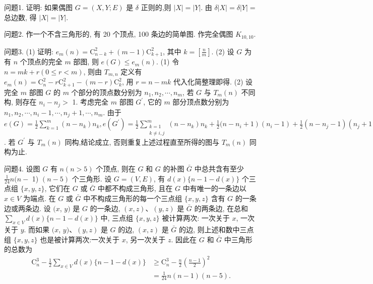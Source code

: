 
问题1. 证明: 如果偶图 $G=(X, Y ; E)$ 是 $\delta$ 正则的,则 $|X|=|Y|$.
由 $\delta|X|=\delta|Y|=$ 总边数, 得 $|X|=|Y|$.



问题2. 作一个不含三角形的, 有 20 个顶点, 100 条边的简单图.
作完全偶图 $K_{10,10}$.



问题3. (1) 证明: $e_m(n)=\mathrm{C}_{n-k}^2+(m-1) \mathrm{C}_{k+1}^2$, 其中 $k=\left[\frac{n}{m}\right]$.
(2) 设 $G$ 为有 $n$ 个顶点的完全 $m$ 部图, 则 $e(G) \leqslant e_m(n)$.
(1) 令 $n=m k+r(0 \leqslant r<m)$, 则由 $T_{m, n}$ 定义有 $e_m(n)=\mathrm{C}_n^2-r \mathrm{C}_{k+1}^2- (m-r) \mathrm{C}_k^2$, 用 $r=n-m k$ 代入化简整理即得.
(2) 设完全 $m$ 部图 $G$ 的 $m$ 个部分的顶点数分别为 $n_1, n_2, \cdots, n_m$, 若 $G$ 与 $T_m(n)$ 不同构, 则存在 $n_i-n_j>$ 1. 考虑完全 $m$ 部图 $G^{\prime}$, 它的 $m$ 部分顶点数分别为 $n_1, n_2, \cdots, n_i-1, \cdots, n_j+ 1, \cdots, n_m$. 由于 $e(G)=\frac{1}{2} \sum_{k=1}^m\left(n-n_k\right) n_k, e\left(G^{\prime}\right)=\frac{1}{2} \sum_{\substack{k=1 \\ k \neq i, j}}^m\left(n-n_k\right) n_k+\frac{1}{2}(n- \left.n_i+1\right)\left(n_i-1\right)+\frac{1}{2}\left(n-n_j-1\right)\left(n_j+1\right)=e(G)+\left(n_i-n_j\right)-1>e(G)$. 若 $G^{\prime}$ 与 $T_m(n)$ 同构,结论成立, 否则重复上述过程直至所得的图与 $T_m(n)$ 同构为止.



问题4. 设图 $G$ 有 $n(n>5)$ 个顶点, 则在 $G$ 和 $G$ 的补图 $\bar{G}$ 中总共含有至少 $\frac{1}{24} n(n-$ 1) $(n-5)$ 个三角形.
设 $G=(V, E)$, 有 $d(x)\{n-1-d(x)\}$ 个三点组 $\{x, y, z\}$, 它们在 $G$ 或 $\bar{G}$ 中都不构成三角形, 且在 $G$ 中有唯一的一条边以 $x \in V$ 为端点.
在 $G$ 或 $\bar{G}$ 中不构成三角形的每一个三点组 $\{x, y, z\}$ 含有 $G$ 的一条边或两条边.
设 $(x$, $y)$ 是 $G$ 的一条边, $(x, z) 、(y, z)$ 是 $\bar{G}$ 的两条边, 在总和 $\sum_{x \in V} d(x)\{n-1- d(x)\}$ 中, 三点组 $\{x, y, z\}$ 被计算两次: 一次关于 $x$, 一次关于 $y$. 而如果 $(x$, $y) 、(y, z)$ 是 $G$ 的边, $(x, z)$ 是 $\bar{G}$ 的边, 则上述和数中三点组 $\{x, y, z\}$ 也是被计算两次:一次关于 $x$, 另一次关于 $z$. 因此在 $G$ 和 $\bar{G}$ 中三角形的总数为
$$
\begin{aligned}
\mathrm{C}_n^3-\frac{1}{2} \sum_{x \in V} d(x)\{n-1-d(x)\} & \geqslant \mathrm{C}_n^3-\frac{n}{2}\left(\frac{n-1}{2}\right)^2 \\
& =\frac{1}{24} n(n-1)(n-5) .
\end{aligned}
$$




